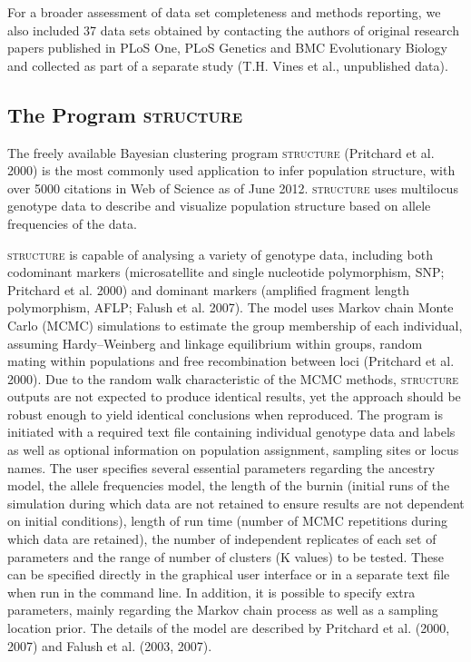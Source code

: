 For a broader assessment of data set completeness and methods reporting, we also included 37 data sets obtained by contacting the authors of original research papers published in PLoS One, PLoS Genetics and BMC Evolutionary Biology and collected as part of a separate study (T.H. Vines et al., unpublished data).

\subsection{The Program \textsc{structure}}
The freely available Bayesian clustering program \textsc{structure} (Pritchard et al. 2000) is the most commonly used application to infer population structure, with over 5000 citations in Web of Science as of June 2012. \textsc{structure} uses multilocus genotype data to describe and visualize population structure based on allele frequencies of the data.

\textsc{structure} is capable of analysing a variety of genotype data, including both codominant markers (microsatellite and single nucleotide polymorphism, SNP; Pritchard et al. 2000) and dominant markers (amplified fragment length polymorphism, AFLP; Falush et al. 2007). The model uses Markov chain Monte Carlo (MCMC) simulations to estimate the group membership of each individual, assuming Hardy–Weinberg and linkage equilibrium within groups, random mating within populations and free recombination between loci (Pritchard et al. 2000). Due to the random walk characteristic of the MCMC methods, \textsc{structure} outputs are not expected to produce identical results, yet the approach should be robust enough to yield identical conclusions when reproduced. The program is initiated with a required text file containing individual genotype data and labels as well as optional information on population assignment, sampling sites or locus names. The user specifies several essential parameters regarding the ancestry
model, the allele frequencies model, the length of the burnin (initial runs of the simulation during which data are not retained to ensure results are not dependent on initial conditions), length of run time (number of MCMC repetitions during which data are retained), the number of independent replicates of each set of parameters and the range of number of clusters (K values) to be tested. These can be specified directly in the graphical user interface or in a separate text file when run in the command line. In addition, it is possible to specify extra parameters, mainly regarding the Markov chain process as well as a sampling location prior. The details of the model are described by Pritchard et al. (2000, 2007) and Falush et al. (2003, 2007).

